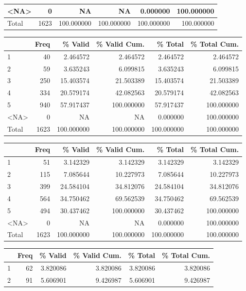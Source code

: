 \documentclass[
  letterpaper,
  DIV=11,
  numbers=noendperiod]{scrartcl}
\begin{document}
\begin{table}
\begin{tabular}[t]{l|r|r|r|r|r}
\hline
<NA> & 0 & NA & NA & 0.000000 & 100.000000\\
\hline
Total & 1623 & 100.000000 & 100.000000 & 100.000000 & 100.000000\\
\hline
\end{tabular}
\centering
\begin{tabular}[t]{l|r|r|r|r|r}
\hline
  & Freq & \% Valid & \% Valid Cum. & \% Total & \% Total Cum.\\
\hline
1 & 40 & 2.464572 & 2.464572 & 2.464572 & 2.464572\\
\hline
2 & 59 & 3.635243 & 6.099815 & 3.635243 & 6.099815\\
\hline
3 & 250 & 15.403574 & 21.503389 & 15.403574 & 21.503389\\
\hline
4 & 334 & 20.579174 & 42.082563 & 20.579174 & 42.082563\\
\hline
5 & 940 & 57.917437 & 100.000000 & 57.917437 & 100.000000\\
\hline
<NA> & 0 & NA & NA & 0.000000 & 100.000000\\
\hline
Total & 1623 & 100.000000 & 100.000000 & 100.000000 & 100.000000\\
\hline
\end{tabular}
\centering
\begin{tabular}[t]{l|r|r|r|r|r}
\hline
  & Freq & \% Valid & \% Valid Cum. & \% Total & \% Total Cum.\\
\hline
1 & 51 & 3.142329 & 3.142329 & 3.142329 & 3.142329\\
\hline
2 & 115 & 7.085644 & 10.227973 & 7.085644 & 10.227973\\
\hline
3 & 399 & 24.584104 & 34.812076 & 24.584104 & 34.812076\\
\hline
4 & 564 & 34.750462 & 69.562539 & 34.750462 & 69.562539\\
\hline
5 & 494 & 30.437462 & 100.000000 & 30.437462 & 100.000000\\
\hline
<NA> & 0 & NA & NA & 0.000000 & 100.000000\\
\hline
Total & 1623 & 100.000000 & 100.000000 & 100.000000 & 100.000000\\
\hline
\end{tabular}
\centering
\begin{tabular}[t]{l|r|r|r|r|r}
\hline
  & Freq & \% Valid & \% Valid Cum. & \% Total & \% Total Cum.\\
\hline
1 & 62 & 3.820086 & 3.820086 & 3.820086 & 3.820086\\
\hline
2 & 91 & 5.606901 & 9.426987 & 5.606901 & 9.426987\\

\end{tabular}
\end{table}
\end{document}
